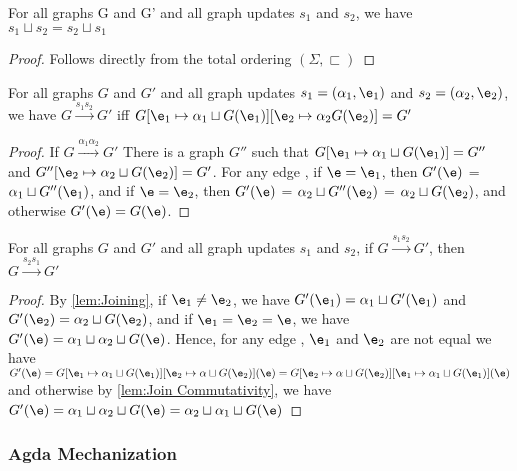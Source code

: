 
\begin{lemma}
  \label{lem:Join Commutativity}
  For all graphs G and G' and all graph updates $s_1$ and $s_2$, we have $s_1 \sqcup s_2 = s_2 \sqcup s_1$
\end{lemma}
\begin{proof}
    Follows directly from the total ordering $(\Sigma, \sqsubset)$
\end{proof}

\begin{lemma}[Joining]
  \label{lem:Joining}
  For all graphs $G$ and $G'$ and all graph updates $s_1 = (\alpha_1, \e_1)$ and  $s_2 = (\alpha_2, \e_2)$, we have
  $G \overset{s_1 s_2}{\longrightarrow} G'$
  iff $G[\e_1 \mapsto \alpha_1 \sqcup G(\e_1)][\e_2 \mapsto \alpha_2 G(\e_2)] = G'$
\end{lemma}
\begin{proof}
  If $G \overset{\alpha_1\alpha_2}{\longrightarrow} G'$
  There is a graph $G''$ such that $G[\e_1 \mapsto \alpha_1 \sqcup G(\e_1)]= G''$ and $G''[\e_2 \mapsto \alpha_2 \sqcup G(\e_2)] = G'$. For any edge \e, if $\e = \e_1$, then $G'(\e)$ = $\alpha_1 \sqcup G''(\e_1)$, and if $\e = \e_2$, then $G'(\e)$ = $\alpha_2 \sqcup G''(\e_2)$ = $\alpha_2 \sqcup G(\e_2)$, and otherwise $G'(\e) = G(\e)$.
\end{proof}


\begin{theorem}[Commutativity]
  \label{thm:Commutativity}
  For all graphs $G$ and $G'$ and all graph updates $s_1$ and $s_2$, 
  if $G \overset{s_1 s_2}{\longrightarrow} G'$,
  then $G \overset{s_2 s_1}{\longrightarrow} G'$
\end{theorem}
\begin{proof}
  By \autoref{lem:Joining}, if $\e_1 \ne \e_2$, we have $G'(\e_1) = \alpha_1 \sqcup G'(\e_1)$ and $G'(\e_2) = \alpha_2 \sqcup G(\e_2)$, and if $\e_1 = \e_2 = \e$, we have $G'(\e) = \alpha_1 \sqcup \alpha_2 \sqcup G(\e)$. Hence, for any edge \e, $\e_1$ and $\e_2$ are not equal we have $G'(\e) = G[\e_1 \mapsto \alpha_1 \sqcup G(\e_1)][\e_2 \mapsto \alpha \sqcup G(\e_2)](\e) = G[\e_2 \mapsto \alpha \sqcup G(\e_2)][\e_1 \mapsto \alpha_1 \sqcup G(\e_1)](\e)$ and otherwise by \autoref{lem:Join Commutativity}, we have $G'(\e) = \alpha_1 \sqcup \alpha_2 \sqcup G(\e) = \alpha_2 \sqcup \alpha_1 \sqcup G(\e)$
\end{proof}

\subsubsection{Agda Mechanization}%
\label{sub:Agda Mechanization}


